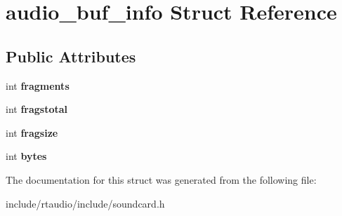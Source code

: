 \hypertarget{structaudio__buf__info}{}\section{audio\+\_\+buf\+\_\+info Struct Reference}
\label{structaudio__buf__info}
\subsection*{Public Attributes}
\begin{DoxyCompactItemize}
\item 
int {\bfseries fragments}\hypertarget{structaudio__buf__info_a3f0a7b7cde3c6503cef56969e966d78b}{}\label{structaudio__buf__info_a3f0a7b7cde3c6503cef56969e966d78b}

\item 
int {\bfseries fragstotal}\hypertarget{structaudio__buf__info_a4d052d3903388c9809377a23e2a01176}{}\label{structaudio__buf__info_a4d052d3903388c9809377a23e2a01176}

\item 
int {\bfseries fragsize}\hypertarget{structaudio__buf__info_a407642d6acd0e9d9130469f384d0e58e}{}\label{structaudio__buf__info_a407642d6acd0e9d9130469f384d0e58e}

\item 
int {\bfseries bytes}\hypertarget{structaudio__buf__info_a5b362ba7db1cf569edcbc24563ec6cd6}{}\label{structaudio__buf__info_a5b362ba7db1cf569edcbc24563ec6cd6}

\end{DoxyCompactItemize}


The documentation for this struct was generated from the following file\+:\begin{DoxyCompactItemize}
\item 
include/rtaudio/include/soundcard.\+h\end{DoxyCompactItemize}
